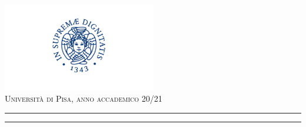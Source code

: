 \begin{titlepage}
	{\large \includegraphics[width= 0.50\textwidth]{immagini/logo_uni}}\\[0.5\baselineskip] %
	
	
	{\large\textsc{Università di Pisa, anno accademico 20/21}} %
	
	\vspace{0.1\textheight} %
	
	
	\rule{\textwidth}{0.4pt} %
	
	\vspace{2pt}\vspace{-\baselineskip} %
	
	\rule{\textwidth}{1pt} %
	
	{\small{}}
	
\end{titlepage}



